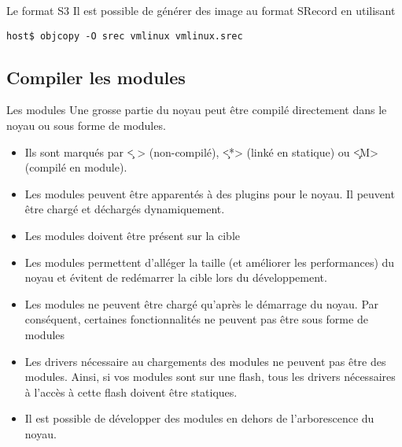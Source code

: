 \begin{frame}[fragile=singleslide]{Le format S3}
  Il est possible  de générer des image au  format SRecord en utilisant
  \begin{lstlisting}
host$ objcopy -O srec vmlinux vmlinux.srec
  \end{lstlisting}
\end{frame}

\subsection{Compiler les modules}
\begin{frame}[fragile=singleslide]{Les modules}
  Une grosse  partie du  noyau peut être  compilé directement  dans le
  noyau ou sous forme de modules.
  \begin{itemize} 
  \item Ils sont marqués par  \c{< >} (non-compilé), \c{<*>} (linké en
    statique) ou \c{<M>} (compilé en module).
  \item  Les modules  peuvent être  apparentés à  des plugins  pour le
    noyau. Il peuvent être chargé et déchargés dynamiquement.
  \item Les modules doivent être présent sur la cible
  \item Les  modules permettent d'alléger la taille  (et améliorer les
    performances) du noyau  et évitent de redémarrer la  cible lors du
    développement.
  \item Les  modules ne peuvent  être chargé qu'après le  démarrage du
    noyau.  Par conséquent, certaines  fonctionnalités ne  peuvent pas
    être sous forme de modules
  \item Les  drivers nécessaire au chargements des  modules ne peuvent
    pas être  des modules. Ainsi, si  vos modules sont  sur une flash,
    tous les drivers nécessaires à  l'accès à cette flash doivent être
    statiques.
  \item  Il  est possible  de  développer  des  modules en  dehors  de
    l'arborescence du noyau.
  \end{itemize}
\end{frame}

